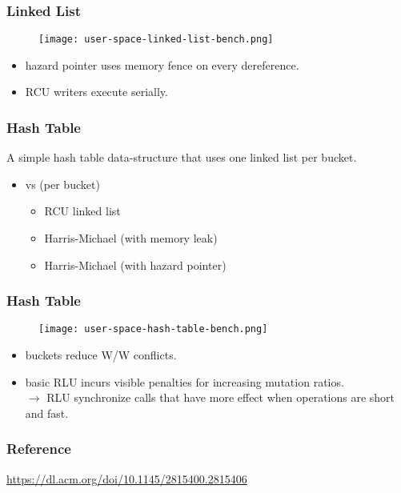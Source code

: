 \documentclass{beamer}
\begin{document}

\begin{frame}[t]
  \frametitle{Linked List}

  \begin{figure}[ht]
    \centering
    \texttt{[image: user-space-linked-list-bench.png]}
  \end{figure}

  \begin{itemize}
  \item hazard pointer uses memory fence on every dereference.
  \item RCU writers execute serially.
  \end{itemize}
  
\end{frame}


\begin{frame}[t]
  \frametitle{Hash Table}
  A simple hash table data-structure that uses one linked list per bucket.

  \begin{itemize}
  \item vs (per bucket)
    \begin{itemize}
    \item RCU linked list
    \item Harris-Michael (with memory leak)
    \item Harris-Michael (with hazard pointer)
    \end{itemize}
  \end{itemize}

\end{frame}


\begin{frame}[t]
  \frametitle{Hash Table}

  \begin{figure}[ht]
    \centering
    \texttt{[image: user-space-hash-table-bench.png]}
  \end{figure}

  \begin{itemize}
  \item buckets reduce W/W conflicts.
  \item basic RLU incurs visible penalties for increasing mutation ratios.\\
    $\rightarrow$ RLU synchronize calls that have more effect when operations
    are short and fast.
  \end{itemize}
  
\end{frame}


\begin{frame}[t]
  \frametitle{Reference}
  \url{https://dl.acm.org/doi/10.1145/2815400.2815406}
\end{frame}
\end{document}
